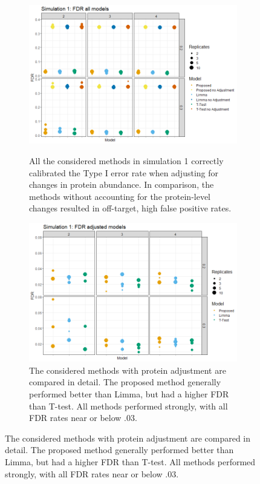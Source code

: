 \documentclass{mcp}
\begin{document}
\begin{figure}[h!]
\centering
 \begin{subfigure}{.9\textwidth}
	\includegraphics[width=.9\textwidth]{sim_new/sim1_FDR_all_models}\\
	\caption{All the considered methods in simulation 1 correctly calibrated the Type I error rate when adjusting for changes in protein abundance. In comparison, the methods without accounting for the protein-level changes resulted in off-target, high false positive rates.}
 \end{subfigure}
 \begin{subfigure}{.9\textwidth}
	\includegraphics[width=.9\textwidth]{sim_new/sim1_FDR}
	\caption{The considered methods with protein adjustment are compared in detail. The proposed method generally performed better than Limma, but had a higher FDR than T-test. All methods performed strongly, with all FDR rates near or below .03.}
 \end{subfigure}
\label{fig:sim1_fpr}
\end{figure}
\end{document}
